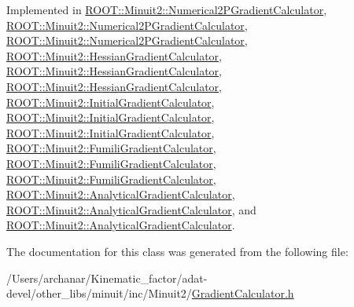 Implemented in \mbox{\hyperlink{classROOT_1_1Minuit2_1_1Numerical2PGradientCalculator_a89c825ba34455277290940fa62fc5321}{R\+O\+O\+T\+::\+Minuit2\+::\+Numerical2\+P\+Gradient\+Calculator}}, \mbox{\hyperlink{classROOT_1_1Minuit2_1_1Numerical2PGradientCalculator_a9ca27ef0f61a678b528f32a002e8002b}{R\+O\+O\+T\+::\+Minuit2\+::\+Numerical2\+P\+Gradient\+Calculator}}, \mbox{\hyperlink{classROOT_1_1Minuit2_1_1Numerical2PGradientCalculator_a9ca27ef0f61a678b528f32a002e8002b}{R\+O\+O\+T\+::\+Minuit2\+::\+Numerical2\+P\+Gradient\+Calculator}}, \mbox{\hyperlink{classROOT_1_1Minuit2_1_1HessianGradientCalculator_ae8832c265494484c65aed77f023b843f}{R\+O\+O\+T\+::\+Minuit2\+::\+Hessian\+Gradient\+Calculator}}, \mbox{\hyperlink{classROOT_1_1Minuit2_1_1HessianGradientCalculator_af6fed0f29a33ec23f97451562d41cfaa}{R\+O\+O\+T\+::\+Minuit2\+::\+Hessian\+Gradient\+Calculator}}, \mbox{\hyperlink{classROOT_1_1Minuit2_1_1HessianGradientCalculator_af6fed0f29a33ec23f97451562d41cfaa}{R\+O\+O\+T\+::\+Minuit2\+::\+Hessian\+Gradient\+Calculator}}, \mbox{\hyperlink{classROOT_1_1Minuit2_1_1InitialGradientCalculator_aca07af1a7ff9e8525c0d4d2d3633f9c5}{R\+O\+O\+T\+::\+Minuit2\+::\+Initial\+Gradient\+Calculator}}, \mbox{\hyperlink{classROOT_1_1Minuit2_1_1InitialGradientCalculator_a673e891a98df0e4a4f71442ab61084bb}{R\+O\+O\+T\+::\+Minuit2\+::\+Initial\+Gradient\+Calculator}}, \mbox{\hyperlink{classROOT_1_1Minuit2_1_1InitialGradientCalculator_a673e891a98df0e4a4f71442ab61084bb}{R\+O\+O\+T\+::\+Minuit2\+::\+Initial\+Gradient\+Calculator}}, \mbox{\hyperlink{classROOT_1_1Minuit2_1_1FumiliGradientCalculator_a652f65091b404ebda9a645d7ba92b3b6}{R\+O\+O\+T\+::\+Minuit2\+::\+Fumili\+Gradient\+Calculator}}, \mbox{\hyperlink{classROOT_1_1Minuit2_1_1FumiliGradientCalculator_a652f65091b404ebda9a645d7ba92b3b6}{R\+O\+O\+T\+::\+Minuit2\+::\+Fumili\+Gradient\+Calculator}}, \mbox{\hyperlink{classROOT_1_1Minuit2_1_1FumiliGradientCalculator_a652f65091b404ebda9a645d7ba92b3b6}{R\+O\+O\+T\+::\+Minuit2\+::\+Fumili\+Gradient\+Calculator}}, \mbox{\hyperlink{classROOT_1_1Minuit2_1_1AnalyticalGradientCalculator_ad16442d24717c36e7d32897a2f8951c0}{R\+O\+O\+T\+::\+Minuit2\+::\+Analytical\+Gradient\+Calculator}}, \mbox{\hyperlink{classROOT_1_1Minuit2_1_1AnalyticalGradientCalculator_a4048ce1c6e9b120f5cb808f090a90030}{R\+O\+O\+T\+::\+Minuit2\+::\+Analytical\+Gradient\+Calculator}}, and \mbox{\hyperlink{classROOT_1_1Minuit2_1_1AnalyticalGradientCalculator_a4048ce1c6e9b120f5cb808f090a90030}{R\+O\+O\+T\+::\+Minuit2\+::\+Analytical\+Gradient\+Calculator}}.



The documentation for this class was generated from the following file\+:\begin{DoxyCompactItemize}
\item 
/\+Users/archanar/\+Kinematic\+\_\+factor/adat-\/devel/other\+\_\+libs/minuit/inc/\+Minuit2/\mbox{\hyperlink{adat-devel_2other__libs_2minuit_2inc_2Minuit2_2GradientCalculator_8h}{Gradient\+Calculator.\+h}}\end{DoxyCompactItemize}
